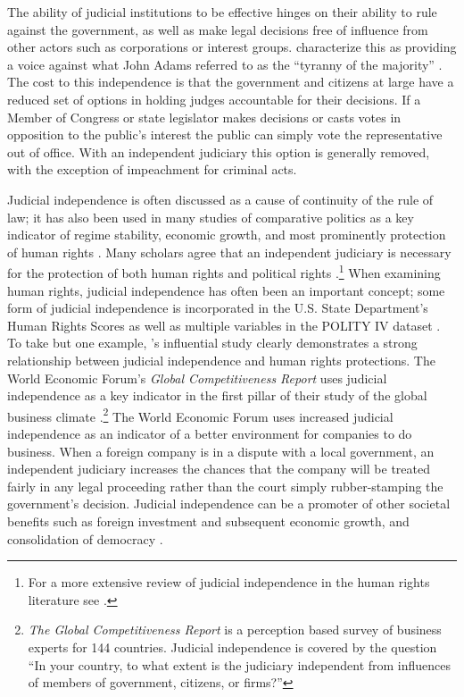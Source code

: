 \documentclass[12pt]{article}
\begin{document}
The ability of judicial institutions to be effective hinges on their ability to rule against the government, as well as make legal decisions free of influence from other actors such as corporations or interest groups.  \citet{Ferejohn2003} characterize this as providing a voice against what John Adams referred to as the ``tyranny of the majority'' \citep{Adams1794}.  The cost to this independence is that the government and citizens at large have a reduced set of options in holding judges accountable for their decisions.  If a Member of Congress or state legislator makes decisions or casts votes in opposition to the public's interest the public can simply vote the representative out of office.  With an independent judiciary this option is generally removed, with the exception of impeachment for criminal acts.

Judicial independence is often discussed as a cause of continuity of the rule of law; it has also been used in many studies of comparative politics as a key indicator of regime stability, economic growth, and most prominently protection of human rights \citep[1]{Linzer2014}.  Many scholars agree that an independent judiciary is necessary for the protection of both human rights and political rights \citep{Keith2002a,Keith2002b,Howard2004,Russell2001}.\footnote{For a more extensive review of judicial independence in the human rights literature see \citep[Footnote 1]{Keith2002b}.}  When examining human rights, judicial independence has often been an important concept; some form of judicial independence is incorporated in the U.S. State Department's Human Rights Scores as well as multiple variables in the POLITY IV dataset \citep{Cingranelli2008, Polity,Howard2004}.  To take but one example, \citet{Keith2002b}'s influential study clearly demonstrates a strong relationship between judicial independence and human rights protections.  The World Economic Forum's \textit{Global Competitiveness Report} uses judicial independence as a key indicator in the first pillar of their study of the global business climate \citep{WEFGLR2014}.\footnote{\textit{The Global Competitiveness Report} is a perception based survey of business experts for 144 countries.  Judicial independence is covered by the question ``In your country, to what extent is the judiciary independent from influences of members of government, citizens, or firms?''}  The World Economic Forum uses increased judicial independence as an indicator of a better environment for companies to do business.  When a foreign company is in a dispute with a local government, an independent judiciary increases the chances that the company will be treated fairly in any legal proceeding rather than the court simply rubber-stamping the government's decision.  Judicial independence can be a promoter of other societal benefits such as foreign investment and subsequent economic growth, and consolidation of democracy \citep[9]{Rios2006}.  
\end{document}
